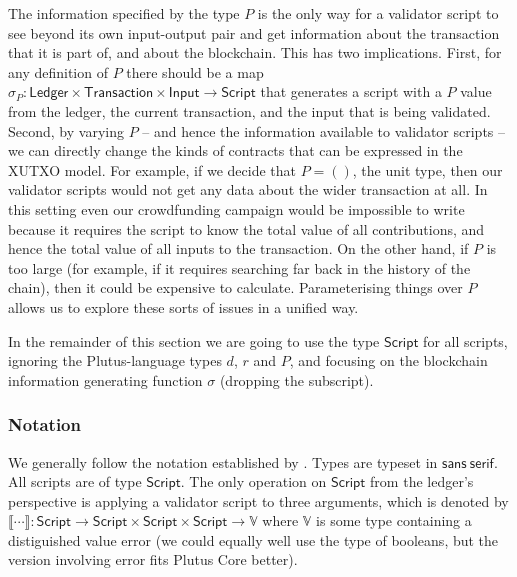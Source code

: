 \documentclass[a4paper]{article}
\theoremstyle{definition}  %
\begin{document}
The information specified by the type $P$ is the only way for a
validator script to see beyond its own input-output pair and get
information about the transaction that it is part of, and about the
blockchain. This has two implications. First, for any definition of
$P$ there should be a map $\sigma_P : \mathsf{Ledger} \times
\mathsf{Transaction} \times \mathsf{Input} \rightarrow
\mathsf{Script}$ that generates a script with a $P$ value from the
ledger, the current transaction, and the input that is being
validated. Second, by varying $P$ -- and hence the information
available to validator scripts -- we can directly change the kinds of
contracts that can be expressed in the XUTXO model. For example, if we
decide that $P = ()$, the unit type, then our validator scripts would
not get any data about the wider transaction at all. In this setting
even our crowdfunding campaign would be impossible to write because it
requires the script to know the total value of all contributions, and
hence the total value of all inputs to the transaction.  On the other
hand, if $P$ is too large (for example, if it requires searching far
back in the history of the chain), then it could be expensive to
calculate.  Parameterising things over $P$ allows us to explore these
sorts of issues in a unified way.

In the remainder of this section we are going to use the type
$\mathsf{Script}$ for all scripts, ignoring the Plutus-language types
$d$, $r$ and $P$, and focusing on the blockchain information
generating function $\sigma$ (dropping the subscript).

\subsubsection{Notation}
We generally follow the notation established by
\cite{Zahnentferner18-UTxO}. Types are typeset in
$\mathsf{sans~serif}$. All scripts are of type $\mathsf{Script}$.  The
only operation on $\mathsf{Script}$ from the ledger's perspective is
applying a validator script to three arguments, which is denoted by
$\llbracket \cdots \rrbracket : \mathsf{Script} \rightarrow
\mathsf{Script} \times \mathsf{Script} \times \mathsf{Script}
\rightarrow \mathbb{V}$ where $\mathbb{V}$ is some type containing a
distiguished value \textsf{error} (we could equally well use the type
of booleans, but the version involving \textsf{error} fits Plutus Core
better).
\end{document}
